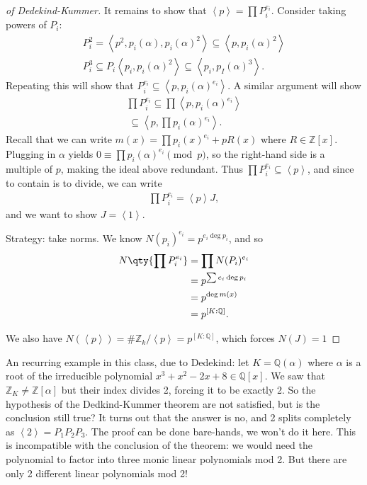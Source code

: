\begin{proof}[of Dedekind-Kummer]
It remains to show that
\(\left\langle{ p }\right\rangle= \prod P_i^{e_i}\). Consider taking
powers of \(P_i\):
\begin{align*}
P_i^2 = \left\langle{ p^2,  p_i( \alpha), p_i(\alpha)^2 }\right\rangle 
\subseteq \left\langle{ p, p_i( \alpha) ^2 }\right\rangle  \\
P_i^3 \subseteq P_i \left\langle{ p_i, p_i (\alpha)^2}\right\rangle \subseteq \left\langle{ p_i, p_I( \alpha)^3 }\right\rangle  
.\end{align*}
Repeating this will show that
\(P_i^{e_i} \subseteq \left\langle{ p, p_i( \alpha)^{e_i} }\right\rangle\).
A similar argument will show
\begin{align*}
\prod P_i^{e_i}
\subseteq 
\prod \left\langle{ p, p_i( \alpha)^{e_i}  }\right\rangle \\\
\subseteq \left\langle{ p, \prod p_i (\alpha) ^{e_i} }\right\rangle 
.\end{align*}
Recall that we can write \(m(x) = \prod p_i(x)^{e_i} + pR(x)\) where
\(R \in {\mathbb{Z}}[x]\). Plugging in \(\alpha\) yields
\(0 \equiv \prod p_i( \alpha)^{e_i} \pmod p\), so the right-hand side is
a multiple of \(p\), making the ideal above redundant. Thus
\(\prod P_i^{e_i} \subseteq \left\langle{ p }\right\rangle\), and since
to contain is to divide, we can write
\begin{align*}
\prod P_i^{e_i} = \left\langle{ p }\right\rangle J
,\end{align*}
and we want to show \(J = \left\langle{ 1 }\right\rangle\).

Strategy: take norms. We know \(N(p_i)^{e_i} = p^{e_i \deg p_i}\), and
so
\begin{align*}
N\qty{ \prod P_i^{e_i} }
&= \prod N(P_i) ^{e_i} \\
&= p^{\sum e_i \deg p_i} \\
&= p^{\deg m(x)} \\
&= p^{[K: {\mathbb{Q}}] }
.\end{align*}

We also have
\(N( \left\langle{ p }\right\rangle ) = \# {\mathbb{Z}}_k / \left\langle{ p }\right\rangle= p^{[K: {\mathbb{Q}}]}\),
which forces \(N(J) = 1\)

\end{proof}

\begin{remark}

An recurring example in this class, due to Dedekind: let
\(K = {\mathbb{Q}}( \alpha)\) where \(\alpha\) is a root of the
irreducible polynomial \(x^3 +x^2 -2x + 8 \in {\mathbb{Q}}[x]\). We saw
that \({\mathbb{Z}}_K \neq {\mathbb{Z}}[ \alpha]\) but their index
divides 2, forcing it to be exactly 2. So the hypothesis of the
Dedkind-Kummer theorem are not satisfied, but is the conclusion still
true? It turns out that the answer is no, and 2 splits completely as
\(\left\langle{ 2 }\right\rangle = P_1 P_2 P_3\). The proof can be done
bare-hands, we won't do it here. This is incompatible with the
conclusion of the theorem: we would need the polynomial to factor into
three monic linear polynomials mod 2. But there are only 2 different
linear polynomials mod 2!

\end{remark}

